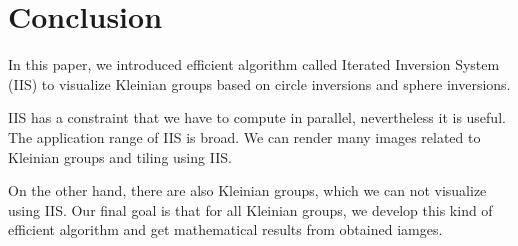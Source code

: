
\section{Conclusion}

In this paper, we introduced efficient algorithm 
called Iterated Inversion System (IIS) to visualize Kleinian
groups based on circle inversions and sphere inversions.

IIS has a constraint that we have to compute in parallel,
nevertheless it is useful. The application range of IIS is broad.
We can render many images related to Kleinian groups and tiling using
IIS.

On the other hand, there are also Kleinian groups, which we can not
visualize using IIS.
Our final goal is that for all Kleinian groups, we develop this kind of
efficient algorithm and get mathematical results from obtained iamges.
